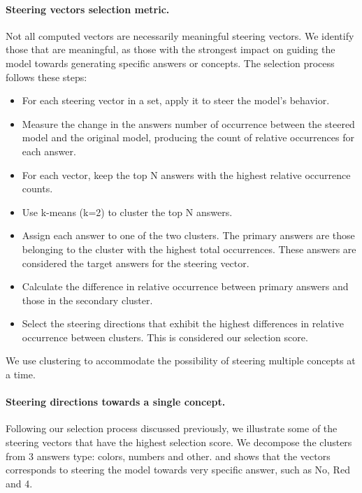 \paragraph{Steering vectors selection metric.} Not all computed vectors are necessarily meaningful steering vectors. We identify those that are meaningful, as those with the strongest impact on guiding the model towards generating specific answers or concepts. The selection process follows these steps:

\begin{itemize} 
    \item For each steering vector in a set, apply it to steer the model's behavior. 
    \item Measure the change in the answers number of occurrence between the steered model and the original model, producing the count of relative occurrences for each answer. 
    \item For each vector, keep the top N answers with the highest relative occurrence counts. 
    \item Use k-means (k=2) to cluster the top N answers. 
    \item Assign each answer to one of the two clusters. The primary answers are those belonging to the cluster with the highest total occurrences. These answers are considered the target answers for the steering vector.
    \item Calculate the difference in relative occurrence between primary answers and those in the secondary cluster. 
    \item Select the steering directions that exhibit the highest differences in relative occurrence between clusters. This is considered our selection score.
\end{itemize}
    
We use clustering to accommodate the possibility of steering multiple concepts at a time.


\paragraph{Steering directions towards a single concept.} Following our selection process discussed previously, we illustrate some of the steering vectors that have the highest selection score. We decompose the clusters from 3 answers type: colors, numbers and other.  and  shows that the vectors corresponds to steering the model towards very specific answer, such as No, Red and 4.


